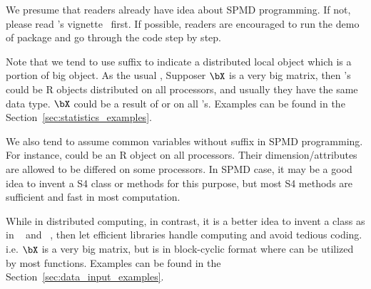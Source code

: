 We presume that readers already have idea about SPMD programming. If not,
please read 's vignette~\cite{Chen2012pbdMPIvignette} first.
If possible, readers are encouraged to run the demo of  package
and go through the code step by step.

Note that we tend to use suffix  to indicate a distributed
local object which is a portion of big object.
As the usual ,
Supposer $\bX$ is a very big matrix, then
's could be R objects distributed on all processors,
and usually they have the same data type.
$\bX$ could be a result of  or  on all
's.
Examples can be found in the Section~\ref{sec:statistics_examples}.

We also tend to assume common variables without suffix 
in SPMD programming.
For instance,  could be an R object on all processors.
Their dimension/attributes are allowed to be differed on some processors.
In SPMD case, it may be a good idea to invent a  S4 class
or methods for this purpose, but most S4 methods are sufficient
and fast in most computation.

While in distributed computing,
in contrast, it is a better idea to invent a  class as in
~\citep{Schmidt2012pbdBASEpackage} and
~\citep{Schmidt2012pbdDMATpackage}, then let efficient libraries
handle computing and avoid tedious coding.
i.e. $\bX$ is a very big matrix, but  is
in block-cyclic format where  can be utilized by most
 functions.
Examples can be found in the Section~\ref{sec:data_input_examples}.

